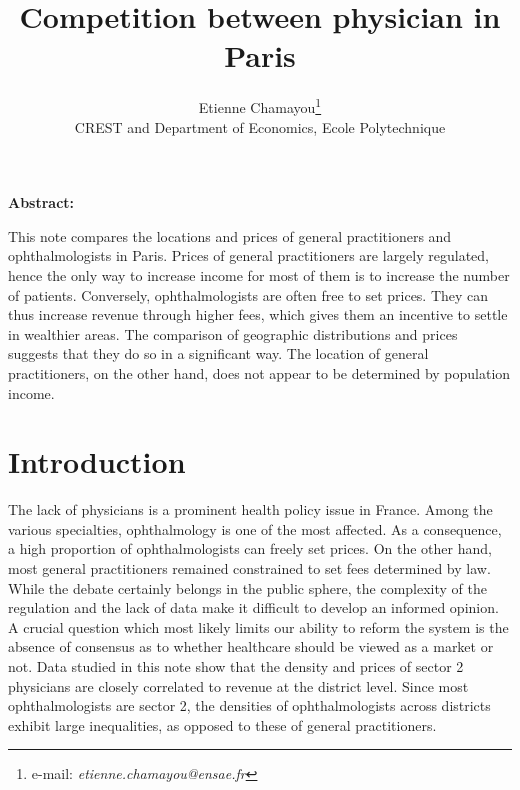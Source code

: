 \documentclass[11pt]{article}
\begin{document}
\title{Competition between physician in Paris}
\author{Etienne Chamayou\thanks{e-mail:
\textit{etienne.chamayou@ensae.fr}}\medskip\\{\normalsize CREST and Department of Economics, Ecole Polytechnique }}
\maketitle

\sloppy%

\onehalfspacing

\textbf{Abstract:}

This note compares the locations and prices of general practitioners and ophthalmologists in Paris. Prices of general practitioners are largely regulated, hence the only way to increase income for most of them is to increase the number of patients. Conversely, ophthalmologists are often free to set prices. They can thus increase revenue through higher fees, which gives them an incentive to settle in wealthier areas. The comparison of geographic distributions and prices suggests that they do so in a significant way. The location of general practitioners, on the other hand, does not appear to be determined by population income.

\strut

\pagebreak%
\doublespacing

\section{Introduction}

The lack of physicians is a prominent health policy issue in France. Among the various specialties, ophthalmology is one of the most affected. As a consequence, a high proportion of ophthalmologists can freely set prices. On the other hand, most general practitioners remained constrained to set fees determined by law. While the debate certainly belongs in the public sphere, the complexity of the regulation and the lack of data make it difficult to develop an informed opinion. A crucial question which most likely limits our ability to reform the system is the absence of consensus as to whether healthcare should be viewed as a market or not. Data studied in this note show that the density and prices of sector 2 physicians are closely correlated to revenue at the district level. Since most ophthalmologists are sector 2, the densities of ophthalmologists across districts exhibit large inequalities, as opposed to these of general practitioners.
\end{document}
